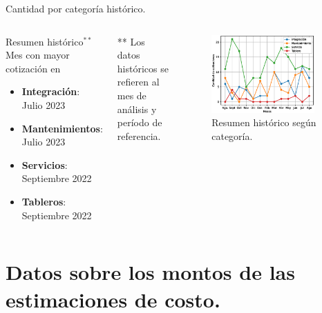 \documentclass[aspectratio=169,xcolor=dvipsnames]{beamer}
\begin{document}
 \begin{frame}{Cantidad por categoría histórico.}
 \begin{columns}[c]
 \begin{block}{Resumen histórico$^{**}$}
    Mes con mayor cotización en
     \begin{itemize}
         \item \textbf{Integración}: Julio 2023
         \item \textbf{Mantenimientos}: Julio 2023
         \item \textbf{Servicios}: Septiembre 2022
         \item \textbf{Tableros}: Septiembre 2022
     \end{itemize}
 \end{block}
 \begin{block}{}
    \tiny{** Los datos históricos se refieren al mes de análisis y período de referencia.}
\end{block}
 \begin{figure}
     \includegraphics[width=0.9\textwidth]{EPS/servicio_cantidad2.eps}
     \caption{Resumen histórico según categoría.}
     \label{graph:resumen_hitorico_categoria}
\end{figure}
 \end{columns}
\end{frame}

\section{Datos sobre los montos de las estimaciones de costo.}
\end{document}
